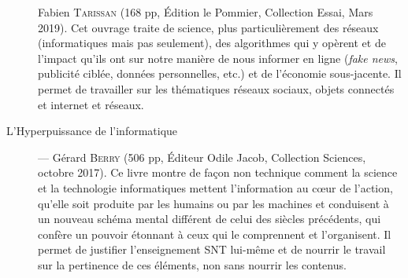 \begin{description}
Fabien \textsc{Tarissan} \linebreak (168 pp, Édition le Pommier, Collection Essai, Mars 2019). Cet ouvrage traite de science, plus particulièrement des réseaux (informatiques mais pas seulement), des algorithmes qui y opèrent et de l'impact qu'ils ont sur notre manière de nous informer en ligne (\textit{fake news}, publicité ciblée, données personnelles, etc.) et de l'économie sous-jacente. Il permet de travailler sur les thématiques réseaux sociaux, objets connectés et internet et réseaux.
\item[L’Hyperpuissance de l’informatique] --- 
Gérard \textsc{Berry} (506 pp, Éditeur Odile Jacob, Collection Sciences, octobre 2017). Ce livre montre de façon non technique comment la science et la technologie informatiques mettent l’information au cœur de l’action, qu’elle soit produite par les humains ou par les machines et conduisent à un nouveau schéma mental différent de celui des siècles précédents, qui confère un pouvoir étonnant à ceux qui le comprennent et l’organisent. Il permet de justifier l'enseignement SNT lui-même et de nourrir le travail sur la pertinence de ces éléments, non sans nourrir les contenus.

\end{description}
